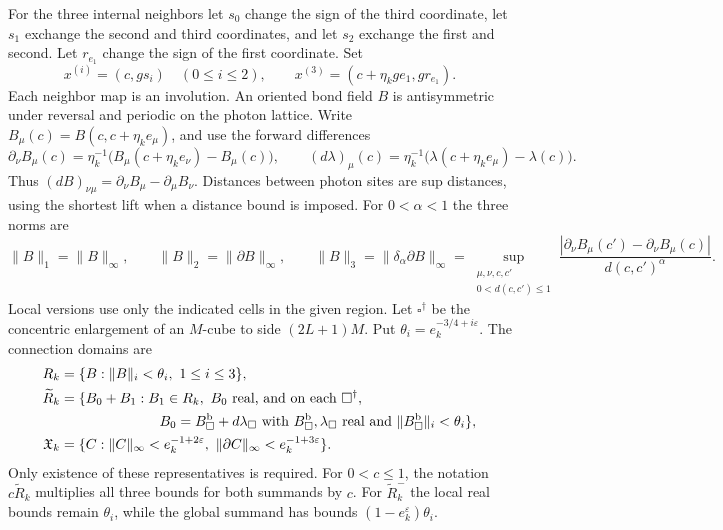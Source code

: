 For the three internal neighbors let \(s_0\) change the sign of
the third coordinate, let \(s_1\) exchange the second and third
coordinates, and let \(s_2\) exchange the first and second.
Let \(r_{e_1}\) change the sign of the first coordinate. Set
\[
 x^{(i)}=(c,gs_i)\quad(0\le i\le2),\qquad
 x^{(3)}=(c+\eta_kge_1,gr_{e_1}).
\]
Each neighbor map is an involution. An oriented bond field
\(B\) is antisymmetric under reversal and periodic on the photon
lattice. Write \(B_\mu(c)=B(c,c+\eta_ke_\mu)\), and use the
forward differences
\[
 \partial_\nu B_\mu(c)=
       \eta_k^{-1}\bigl(B_\mu(c+\eta_ke_\nu)-B_\mu(c)\bigr),
 \qquad
 (d\lambda)_\mu(c)=
       \eta_k^{-1}\bigl(\lambda(c+\eta_ke_\mu)-\lambda(c)\bigr).
\]
Thus \((dB)_{\nu\mu}=\partial_\nu B_\mu-\partial_\mu B_\nu\).
Distances between photon sites are sup distances, using the
shortest lift when a distance bound is imposed. For \(0<\alpha<1\)
the three norms are
\[
 \|B\|_1=\|B\|_\infty,\qquad
 \|B\|_2=\|\partial B\|_\infty,\qquad
 \|B\|_3=\|\delta_\alpha\partial B\|_\infty
 =\sup_{\substack{\mu,\nu,c,c'\\0<d(c,c')\le1}}
 \frac{|\partial_\nu B_\mu(c')-\partial_\nu B_\mu(c)|}
      {d(c,c')^\alpha}.
\]
Local versions use only the indicated cells in the given region.
Let \(\square^\dagger\) be the concentric enlargement of an
\(M\)-cube to side \((2L+1)M\). Put
\(\theta_i=e_k^{-3/4+i\varepsilon}\).
The connection domains are
\begin{equation}\label{eq:connection-domains}
\begin{split}
 R_k&=\{B:\|B\|_i<\theta_i,\ 1\le i\le3\},\\
 \widetilde R_k&=\{B_0+B_1:B_1\in R_k,\ B_0\text{ real, and on each }
          \square^\dagger,\\
 &\hspace{25mm} B_0=B_\square^{\mathrm b}+d\lambda_\square
   \text{ with }B_\square^{\mathrm b},\lambda_\square\text{ real and }
          \|B_\square^{\mathrm b}\|_i<\theta_i\},\\
 \mathfrak X_k&=\{C:\|C\|_\infty<e_k^{-1+2\varepsilon},\
                       \|\partial C\|_\infty<e_k^{-1+3\varepsilon}\}.
\end{split}
\end{equation}
Only existence of these representatives is required.
For \(0<c\le1\), the notation \(c\widetilde R_k\) multiplies
all three bounds for both summands by \(c\).
For \(\widetilde R_k^-\) the local real bounds remain
\(\theta_i\), while the global summand has bounds
\((1-e_k^\varepsilon)\theta_i\).

